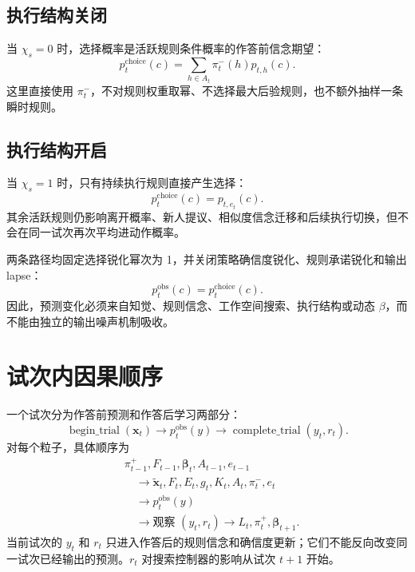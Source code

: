 \documentclass[12pt]{article}
\begin{document}
\subsection{执行结构关闭}

当 $\chi_s=0$ 时，选择概率是活跃规则条件概率的作答前信念期望：
\begin{equation}
p_t^{\mathrm{choice}}(c)
=\sum_{h\in A_t}\pi_t^{-}(h)p_{t,h}(c).
\label{eq:choice-execution-off}
\end{equation}
这里直接使用 $\pi_t^{-}$，不对规则权重取幂、不选择最大后验规则，也不额外抽样一条瞬时规则。

\subsection{执行结构开启}

当 $\chi_s=1$ 时，只有持续执行规则直接产生选择：
\begin{equation}
p_t^{\mathrm{choice}}(c)=p_{t,e_t}(c).
\label{eq:choice-execution-on}
\end{equation}
其余活跃规则仍影响离开概率、新人提议、相似度信念迁移和后续执行切换，但不会在同一试次再次平均进动作概率。

两条路径均固定选择锐化幂次为 1，并关闭策略确信度锐化、规则承诺锐化和输出 lapse：
\begin{equation}
p_t^{\mathrm{obs}}(c)=p_t^{\mathrm{choice}}(c).
\label{eq:no-output-noise}
\end{equation}
因此，预测变化必须来自知觉、规则信念、工作空间搜索、执行结构或动态 $\beta$，而不能由独立的输出噪声机制吸收。


\section{试次内因果顺序}

一个试次分为作答前预测和作答后学习两部分：
\begin{equation}
\operatorname{begin\_trial}(\bm x_t)
\longrightarrow
p_t^{\mathrm{obs}}(y)
\longrightarrow
\operatorname{complete\_trial}(y_t,r_t).
\label{eq:lifecycle}
\end{equation}
对每个粒子，具体顺序为
\begin{equation}
\begin{aligned}
&\pi_{t-1}^{+},F_{t-1},\bm\beta_t,A_{t-1},e_{t-1}
\\
&\quad\longrightarrow
\widetilde{\bm x}_t,F_t,E_t,g_t,K_t,A_t,\pi_t^{-},e_t
\\
&\quad\longrightarrow
p_t^{\mathrm{obs}}(y)
\\
&\quad\longrightarrow
\text{观察 }(y_t,r_t)
\longrightarrow
L_t,\pi_t^{+},\bm\beta_{t+1}.
\end{aligned}
\label{eq:causal-order}
\end{equation}
当前试次的 $y_t$ 和 $r_t$ 只进入作答后的规则信念和确信度更新；它们不能反向改变同一试次已经输出的预测。$r_t$ 对搜索控制器的影响从试次 $t+1$ 开始。
\end{document}
